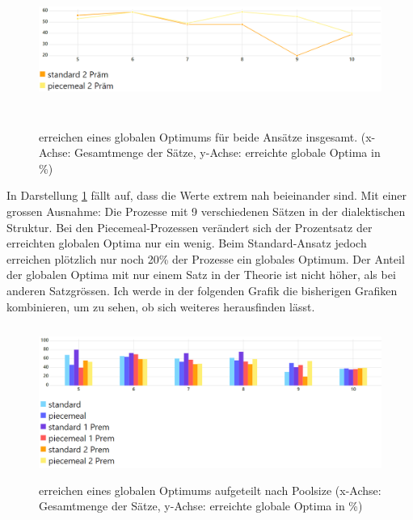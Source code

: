 \documentclass{article}
\begin{document}
\begin{figure}[h]
  \centering
  \includegraphics[width=\textwidth,height=5cm,keepaspectratio]{images/global_optima_standard_piecemeal_2prem.png}
  \caption{erreichen eines globalen Optimums für beide Ansätze insgesamt. (x-Achse: Gesamtmenge der Sätze, y-Achse: erreichte globale Optima in \%) \label{fig:GlobOptPoolsizeLineTwoPrem}}
\end{figure}

In Darstellung \ref{fig:GlobOptPoolsizeLineTwoPrem} fällt auf, dass die Werte extrem nah beieinander sind. Mit einer grossen Ausnahme: Die Prozesse mit 9 verschiedenen Sätzen in der dialektischen Struktur. Bei den Piecemeal-Prozessen verändert sich der Prozentsatz der erreichten globalen Optima nur ein wenig. Beim Standard-Ansatz jedoch erreichen plötzlich nur noch 20\% der Prozesse ein globales Optimum. Der Anteil der globalen Optima mit nur einem Satz in der Theorie ist nicht höher, als bei anderen Satzgrössen. Ich werde in der folgenden Grafik die bisherigen Grafiken kombinieren, um zu sehen, ob sich weiteres herausfinden lässt.

\begin{figure}[ht]
  \centering
  \includegraphics[width=\textwidth,height=5cm,keepaspectratio]{erreichen eines Globalen Optimums aufgeteilt nach Poolsize}
  \caption{erreichen eines globalen Optimums aufgeteilt nach Poolsize (x-Achse: Gesamtmenge der Sätze, y-Achse: erreichte globale Optima in \%) \label{fig:GlobOptPoolsize}}
\end{figure}
\end{document}
